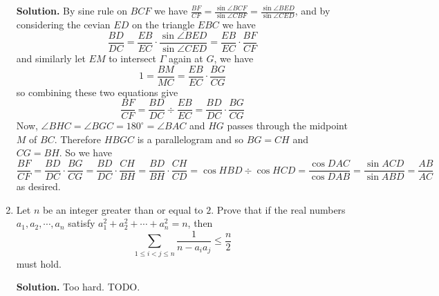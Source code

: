 \documentclass[11pt,a4paper]{article}
\begin{document}
\begin{enumerate}
	\textbf{Solution.} By sine rule on $BCF$ we have $\frac{BF}{CF}=\frac{\sin\angle BCF}{\sin\angle CBF}=\frac{\sin\angle BED}{\sin\angle CED}$, and by considering the cevian $ED$ on the triangle $EBC$ we have 
	\[
	\frac{BD}{DC}=\frac{EB}{EC}\cdot \frac{\sin\angle BED}{\sin\angle CED} 
	=\frac{EB}{EC}\cdot \frac{BF}{CF}
	\]
	and similarly let $EM$ to intersect $\Gamma$ again at $G$, we have 
	\[
	1=\frac{BM}{MC}=\frac{EB}{EC}\cdot \frac{BG}{CG}
	\]
	so combining these two equations give 
	\[
	\frac{BF}{CF}=\frac{BD}{DC}\div \frac{EB}{EC}= \frac{BD}{DC}\cdot \frac{BG}{CG}
	\]
	Now, $\angle BHC=\angle BGC=180^{\circ}=\angle BAC$ and $HG$ passes through the midpoint $M$ of $BC$. Therefore $HBGC$ is a parallelogram and so $BG=CH$ and $CG=BH$. So we have 
	\[
	\frac{BF}{CF}=\frac{BD}{DC}\cdot \frac{BG}{CG}=\frac{BD}{DC}\cdot \frac{CH}{BH}=\frac{BD}{BH}\cdot \frac{CH}{CD}
	=\cos HBD\div \cos HCD = \frac{\cos DAC}{\cos DAB} = \frac{\sin ACD}{\sin ABD} = \frac{AB}{AC}
	\]
	as desired. 
	
	\item Let $ n $ be an integer greater than or equal to $ 2 $. Prove that if the real numbers $ a_1 , a_2 , \cdots , a_n $ satisfy $ a_1 ^2 + a_2 ^2 + \cdots + a_n ^ 2 = n $, then
	\[\sum_{1 \le i < j \le n} \frac{1}{n- a_i a_j}  \le \frac{n}{2} \]
	must hold.
	
	\textbf{Solution.} Too hard. TODO. 
\end{enumerate}
\end{document}
